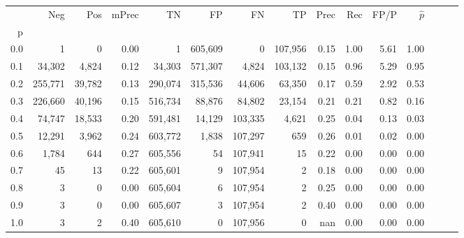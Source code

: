 \begin{tabular}{rrrrrrrrrrrrrrr}
\toprule
{} &      Neg &     Pos & mPrec &       TN &       FP &       FN &       TP &  Prec &   Rec &  FP/P & $\hat{p}$ \\
p   &          &         &       &          &          &          &          &       &       &       &           \\
\midrule
0.0 &        1 &       0 &  0.00 &        1 &  605,609 &        0 &  107,956 &  0.15 &  1.00 &  5.61 &      1.00 \\
0.1 &   34,302 &   4,824 &  0.12 &   34,303 &  571,307 &    4,824 &  103,132 &  0.15 &  0.96 &  5.29 &      0.95 \\
0.2 &  255,771 &  39,782 &  0.13 &  290,074 &  315,536 &   44,606 &   63,350 &  0.17 &  0.59 &  2.92 &      0.53 \\
0.3 &  226,660 &  40,196 &  0.15 &  516,734 &   88,876 &   84,802 &   23,154 &  0.21 &  0.21 &  0.82 &      0.16 \\
0.4 &   74,747 &  18,533 &  0.20 &  591,481 &   14,129 &  103,335 &    4,621 &  0.25 &  0.04 &  0.13 &      0.03 \\
0.5 &   12,291 &   3,962 &  0.24 &  603,772 &    1,838 &  107,297 &      659 &  0.26 &  0.01 &  0.02 &      0.00 \\
0.6 &    1,784 &     644 &  0.27 &  605,556 &       54 &  107,941 &       15 &  0.22 &  0.00 &  0.00 &      0.00 \\
0.7 &       45 &      13 &  0.22 &  605,601 &        9 &  107,954 &        2 &  0.18 &  0.00 &  0.00 &      0.00 \\
0.8 &        3 &       0 &  0.00 &  605,604 &        6 &  107,954 &        2 &  0.25 &  0.00 &  0.00 &      0.00 \\
0.9 &        3 &       0 &  0.00 &  605,607 &        3 &  107,954 &        2 &  0.40 &  0.00 &  0.00 &      0.00 \\
1.0 &        3 &       2 &  0.40 &  605,610 &        0 &  107,956 &        0 &   nan &  0.00 &  0.00 &      0.00 \\
\bottomrule
\end{tabular}
